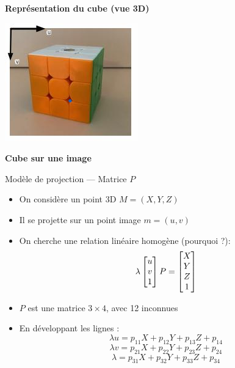 \begin{frame}
\begin{minipage}{0.48\textwidth}
    {\footnotesize\textbf{Représentation du cube (vue 3D)}}
\end{minipage}
\hfill
\begin{minipage}{0.48\textwidth}
    \centering
    \includegraphics[width=\linewidth]{capture/cube_repere.png}
    \vspace{0.5em}

    {\footnotesize\textbf{Cube sur une image}}
\end{minipage}

\end{frame}

\begin{frame}{Modèle de projection — Matrice \( P \)}

\begin{itemize}
  \item<1-> On considère un point 3D \( M = (X, Y, Z) \)
  \item<2-> Il se projette sur un point image \( m = (u, v) \)
  \hyperlink{projection-appendix}{
  }
  \item<3-> On cherche une relation linéaire homogène (pourquoi ?):
  \[
  \lambda
  \begin{bmatrix}
  u \cr v \cr 1
  \end{bmatrix}
  P
  =
  \begin{bmatrix}
  X \cr Y \cr Z \cr 1
  \end{bmatrix}
  \]

  \item<4-> \( P \) est une matrice \( 3 \times 4 \), avec 12 inconnues
  \item<5-> En développant les lignes :
  \[
  \lambda u = p_{11}X + p_{12}Y + p_{13}Z + p_{14}
  \]
  \[
  \lambda v = p_{21}X + p_{22}Y + p_{23}Z + p_{24}
  \]
  \[
  \lambda   = p_{31}X + p_{32}Y + p_{33}Z + p_{34}
  \]
\end{itemize}
\end{frame}


